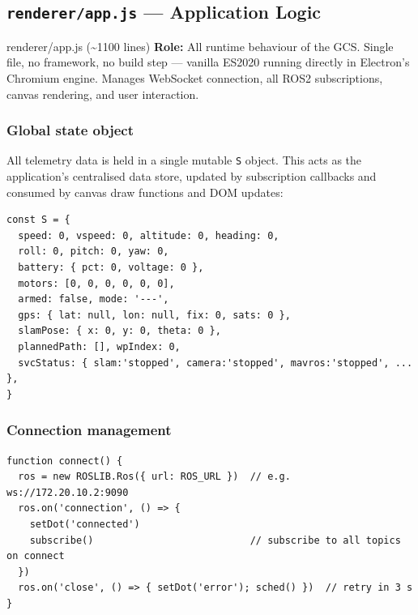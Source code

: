 \documentclass[11pt,a4paper]{article}
\begin{document}
\subsection{\texttt{renderer/app.js} — Application Logic}

\begin{filebox}{renderer/app.js \textnormal{(\textasciitilde 1100 lines)}}
\textbf{Role:} All runtime behaviour of the GCS. Single file, no framework,
no build step — vanilla ES2020 running directly in Electron's Chromium engine.
Manages WebSocket connection, all ROS2 subscriptions, canvas rendering, and
user interaction.
\end{filebox}

\subsubsection{Global state object}

All telemetry data is held in a single mutable \texttt{S} object. This acts
as the application's centralised data store, updated by subscription callbacks
and consumed by canvas draw functions and DOM updates:

\begin{lstlisting}[style=javascript, caption=Shared state object S (selected fields)]
const S = {
  speed: 0, vspeed: 0, altitude: 0, heading: 0,
  roll: 0, pitch: 0, yaw: 0,
  battery: { pct: 0, voltage: 0 },
  motors: [0, 0, 0, 0, 0, 0],
  armed: false, mode: '---',
  gps: { lat: null, lon: null, fix: 0, sats: 0 },
  slamPose: { x: 0, y: 0, theta: 0 },
  plannedPath: [], wpIndex: 0,
  svcStatus: { slam:'stopped', camera:'stopped', mavros:'stopped', ... },
}
\end{lstlisting}

\subsubsection{Connection management}

\begin{lstlisting}[style=javascript, caption=rosbridge WebSocket connection]
function connect() {
  ros = new ROSLIB.Ros({ url: ROS_URL })  // e.g. ws://172.20.10.2:9090
  ros.on('connection', () => {
    setDot('connected')
    subscribe()                           // subscribe to all topics on connect
  })
  ros.on('close', () => { setDot('error'); sched() })  // retry in 3 s
}
\end{lstlisting}
\end{document}
